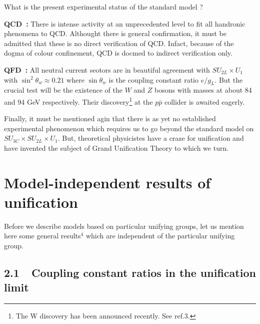What is the present experimental status of the standard model ?

{\bf QCD~:} There is intense activity at an unprecedented level to fit all handronic phenomena to QCD. Althought there is general confirmation, it must be admitted that these is no direct verification of QCD. Infact, because of the dogma of colour confinement, QCD is docmed to indirect verification only. 

{\bf QFD~:} All neutral current seotors are in beautiful agreement with $SU_{2L} \times U_{1}$ with $\sin^{2} \theta_{w} \approx 0.21$ where $\sin \theta_{w}$ is the coupling constant ratio $e/g_{L}$. But the crucial test will be the existence of the $W$ and $Z$ bosons with masses at about 84 and 94 GeV respectively. Their discovery\footnote{The W discovery has been announced recently. See ref.3.} at the $p\bar{p}$ collider is awaited eagerly.

Finally, it must be mentioned agin that there is as yet no established experimental phenomenon which requires us to go beyond the standard model on $SU_{3C} \times SU_{2L} \times U_{1}$. But, theoretical physicistes have a craze for unification and have invented the subject of Grand Unification Theory to which we turn.

\section{Model-independent results of unification}\label{sec-2}

Before we describe models based on particular unifying groups, let us mention here some general results$^{4}$ which are independent of the particular unifying group.

\subsection{2.1~~Coupling constant ratios in the unification limit}\label{subsec-2.1}

